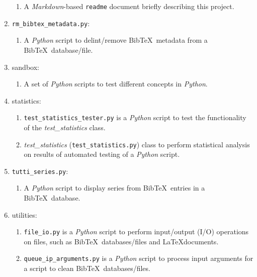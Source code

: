\begin{enumerate}
	\begin{enumerate} \itemsep -2pt
	\item A {\it Markdown}-based {\tt readme} document briefly describing this project.
	\end{enumerate}
\item {\tt rm\_bibtex\_metadata.py}: \vspace{-0.3cm}
	\begin{enumerate} \itemsep -2pt
	\item A {\it Python} script to delint/remove {\sc Bib}\TeX\ metadata from a {\sc Bib}\TeX\ database/file.
	\end{enumerate}
\item sandbox: \vspace{-0.3cm}
	\begin{enumerate} \itemsep -2pt
	\item A set of {\it Python} scripts to test different concepts in {\it Python}.
	\end{enumerate}
\item statistics: \vspace{-0.3cm}
	\begin{enumerate} \itemsep -2pt
	\item {\tt test\_statistics\_tester.py} is a {\it Python} script to test the functionality of the {\it test\_statistics} class.
	\item {\it test\_statistics} ({\tt test\_statistics.py}) class to perform statistical analysis on results of automated testing of a {\it Python} script.
	\end{enumerate}
\item {\tt tutti\_series.py}: \vspace{-0.3cm}
	\begin{enumerate} \itemsep -2pt
	\item A {\it Python} script to display series from {\sc Bib}\TeX\ entries in a {\sc Bib}\TeX\ database.
	\end{enumerate}
\item utilities: \vspace{-0.3cm}
	\begin{enumerate} \itemsep -2pt
	\item {\tt file\_io.py} is a {\it Python} script to perform input/output (I/O) operations on files, such as {\sc Bib}\TeX\ databases/files and \LaTeX documents.
	\item {\tt queue\_ip\_arguments.py} is a {\it Python} script to process input arguments for a script to clean {\sc Bib}\TeX\ databases/files.

\end{enumerate}
\end{enumerate}
